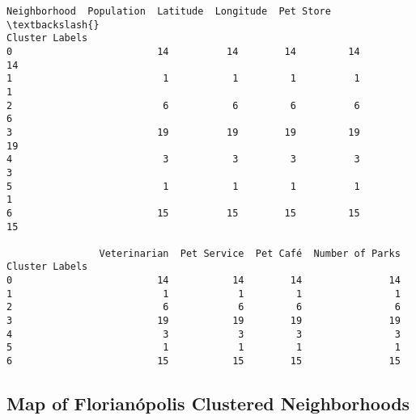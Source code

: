 \documentclass[11pt]{article}
\makeatletter
\newcommand{\boxspacing}{\kern\kvtcb@left@rule\kern\kvtcb@boxsep}
\newcommand{\prompt}[4]{
        \ttfamily\llap{{\color{#2}[#3]:\hspace{3pt}#4}}\vspace{-\baselineskip}
    }
\makeatother
\begin{document}
            \begin{tcolorbox}[breakable, size=fbox, boxrule=.5pt, pad at break*=1mm, opacityfill=0]
\prompt{Out}{outcolor}{25}{\boxspacing}
\begin{Verbatim}[commandchars=\\\{\}]
                Neighborhood  Population  Latitude  Longitude  Pet Store  \textbackslash{}
Cluster Labels
0                         14          14        14         14         14
1                          1           1         1          1          1
2                          6           6         6          6          6
3                         19          19        19         19         19
4                          3           3         3          3          3
5                          1           1         1          1          1
6                         15          15        15         15         15

                Veterinarian  Pet Service  Pet Café  Number of Parks
Cluster Labels
0                         14           14        14               14
1                          1            1         1                1
2                          6            6         6                6
3                         19           19        19               19
4                          3            3         3                3
5                          1            1         1                1
6                         15           15        15               15
\end{Verbatim}
\end{tcolorbox}
        
    \hypertarget{map-of-florianuxf3polis-clustered-neighborhoods}{%
\subsection{Map of Florianópolis Clustered
Neighborhoods}\label{map-of-florianuxf3polis-clustered-neighborhoods}}
\end{document}
